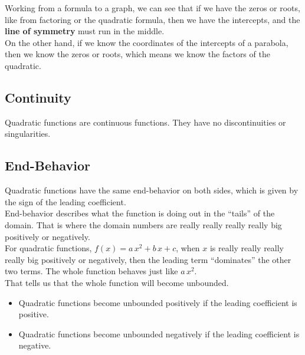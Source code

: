\documentclass{ximera}
\begin{document}
Working from a formula to a graph, we can see that if we have the zeros or roots, like from factoring or the quadratic formula, then we have the intercepts, and the \textbf{line of symmetry} must run in the middle. \\


On the other hand, if we know the coordinates of the intercepts of a parabola, then we know the zeros or roots, which means we know the factors of the quadratic.











\subsection*{Continuity}

Quadratic functions are continuous functions.  They have no discontinuities or singularities. \\












\subsection*{End-Behavior}

Quadratic functions have the same end-behavior on both sides, which is given by the sign of the leading coefficient. \\


End-behavior describes what the function is doing out in the ``tails'' of the domain.  That is where the domain numbers are really really really really big positively or negatively. \\

For quadratic functions, $f(x) = a \, x^2 + b \, x + c$, when $x$ is really really really really big positively or negatively, then the leading term ``dominates'' the other two terms.  The whole function behaves just like $a \, x^2$. \\

That tells us that the whole function will become unbounded. \\


\begin{itemize}
     \item Quadratic functions become unbounded positively if the leading coefficient is positive.
     \item Quadratic functions become unbounded negatively if the leading coefficient is negative.
\end{itemize}
\end{document}
